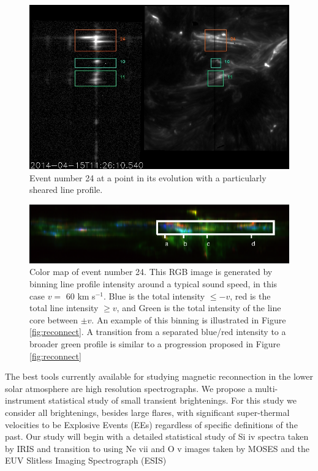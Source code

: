 \documentclass[]{aastex6}
\begin{document}
\begin{figure}
	
	\caption{Event number 24 at a point in its evolution with a particularly sheared line profile.}
	\centerline{\includegraphics[scale=.4]{NESSF_img/01481.jpg}}
	\label{fig:eemovie}
\end{figure}

\begin{figure}
	\caption{Color map of event number 24. This RGB image is generated by binning line profile intensity around a typical sound speed, in this case $v = $ 60 km s$^{-1}$.  Blue is the total intensity  $\leq -v$, red is the total line intensity $\geq v$, and Green is the total intensity of the line core between $\pm v$. An example of this binning is illustrated in Figure \ref{fig:reconnect}.  A transition from a separated blue/red intensity to a broader green profile is similar to a progression proposed in Figure \ref{fig:reconnect}}
	\label{fig:eecolor}
	\centerline{\includegraphics[scale=2]{NESSF_img/ee_color.eps}}
	
\end{figure}

The best tools currently available for studying magnetic reconnection in the lower solar atmosphere are high resolution spectrographs.  We propose a multi-instrument statistical study of small transient brightenings.  For this study we consider all brightenings, besides large flares, with significant super-thermal velocities to be Explosive Events (EEs) regardless of specific definitions of the past.  Our study will begin with a detailed statistical study of Si {\sc iv} spectra taken by IRIS and transition to using Ne {\sc vii} and O {\sc v} images taken by MOSES and the EUV Slitless Imaging Spectrograph (ESIS)
\end{document}
